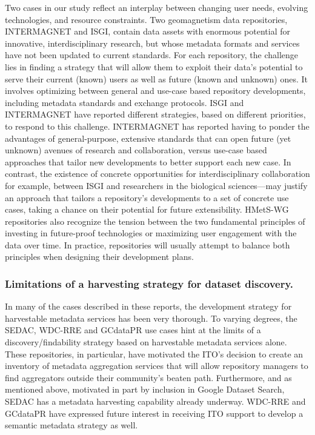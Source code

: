 \documentclass{interact}
\begin{document}
Two cases in our study reflect an interplay between changing user needs, evolving technologies, and resource constraints.  Two geomagnetism data repositories, INTERMAGNET and ISGI, contain data assets with enormous potential for innovative, interdisciplinary research, but whose metadata formats and services have not been updated to current standards. For each repository, the challenge lies in finding a strategy that will allow them to exploit their data's potential to serve their current (known) users as well as future (known and unknown) ones. It involves optimizing between general and use-case based repository developments, including metadata standards and exchange protocols. ISGI and INTERMAGNET have reported different strategies, based on different priorities, to respond to this challenge. INTERMAGNET has reported having to ponder the advantages of general-purpose, extensive standards that can open future (yet unknown) avenues of research and collaboration, versus use-case based approaches that tailor new developments to better support each new case. In contrast, the existence of concrete opportunities for interdisciplinary collaboration for example, between ISGI and researchers in the biological sciences—may justify an approach that tailors a repository's developments to a set of concrete use cases, taking a chance on their potential for future extensibility. HMetS-WG repositories also recognize the tension between the two fundamental principles of investing in future-proof technologies or maximizing user engagement with the data over time. In practice, repositories will usually attempt to balance both principles when designing their development plans.

\subsubsection{Limitations of a harvesting strategy for dataset discovery.}
In many of the cases described in these reports, the development strategy for harvestable metadata services has been very thorough. To varying degrees, the SEDAC, WDC-RRE and GCdataPR use cases hint at the limits of a discovery/findability strategy based on harvestable metadata services alone. These repositories, in particular, have motivated the ITO’s decision to create an inventory of metadata aggregation services \parencite{li_searchable_2021} that will allow repository managers to find aggregators outside their community’s beaten path. Furthermore, and as mentioned above, motivated in part by inclusion in Google Dataset Search, SEDAC has a metadata harvesting capability already underway. WDC-RRE and GCdataPR have expressed future interest in receiving ITO support to develop a semantic metadata strategy as well.
\end{document}
